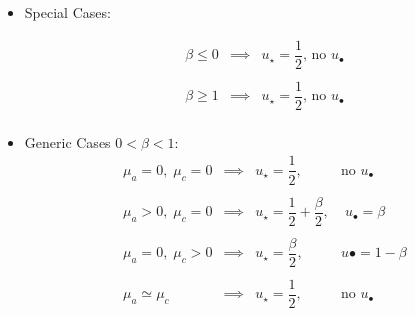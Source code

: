 \documentclass[aps,12pt]{revtex4}
\begin{document}
\begin{itemize}
\item Special Cases:

\begin{equation}
\begin{array}{lcl}
\beta \leq 0           & \implies & u_\star = \dfrac{1}{2} \text{, no $u_\bullet$}\\
\\
\beta \geq 1           & \implies & u_\star = \dfrac{1}{2} \text{, no $u_\bullet$}\\
\end{array}
\end{equation}

\item Generic Cases $0<\beta<1$:
\begin{equation}
\begin{array}{lcll}
\mu_a = 0, \;\mu_c = 0 & \implies & u_\star = \dfrac{1}{2}, & \text{no $u_\bullet$}\\
\\
\mu_a > 0, \;\mu_c = 0 & \implies & u_\star = \dfrac{1}{2} + \dfrac{\beta}{2}, &\; u_\bullet=\beta \\
\\
\mu_a = 0, \;\mu_c > 0 & \implies & u_\star = \dfrac{\beta}{2}, & u\bullet = 1 - \beta \\
\\
\mu_a \simeq \mu_c & \implies & u_\star = \dfrac{1}{2}, & \text{no $u_\bullet$} \\
\end{array}
\end{equation}

\end{itemize}



 
\end{document}
